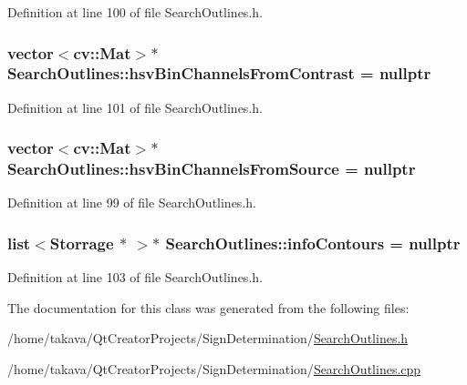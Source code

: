 Definition at line 100 of file Search\+Outlines.\+h.

\hypertarget{class_search_outlines_a236b9910b73900271297548d3744d506}{
\subsubsection[{hsv\+Bin\+Channels\+From\+Contrast}]{\setlength{\rightskip}{0pt plus 5cm}vector$<$cv\+::\+Mat$>$$\ast$ Search\+Outlines\+::hsv\+Bin\+Channels\+From\+Contrast = nullptr\hspace{0.3cm}{\ttfamily [private]}}}\label{class_search_outlines_a236b9910b73900271297548d3744d506}


Definition at line 101 of file Search\+Outlines.\+h.

\hypertarget{class_search_outlines_a455efed931c502f14dbf88c87974214d}{
\subsubsection[{hsv\+Bin\+Channels\+From\+Source}]{\setlength{\rightskip}{0pt plus 5cm}vector$<$cv\+::\+Mat$>$$\ast$ Search\+Outlines\+::hsv\+Bin\+Channels\+From\+Source = nullptr\hspace{0.3cm}{\ttfamily [private]}}}\label{class_search_outlines_a455efed931c502f14dbf88c87974214d}


Definition at line 99 of file Search\+Outlines.\+h.

\hypertarget{class_search_outlines_a1b1d7e6dd5c6c2b30c397f9f6d712dd1}{
\subsubsection[{info\+Contours}]{\setlength{\rightskip}{0pt plus 5cm}list$<${\bf Storrage} $\ast$ $>$$\ast$ Search\+Outlines\+::info\+Contours = nullptr\hspace{0.3cm}{\ttfamily [private]}}}\label{class_search_outlines_a1b1d7e6dd5c6c2b30c397f9f6d712dd1}


Definition at line 103 of file Search\+Outlines.\+h.



The documentation for this class was generated from the following files\+:\begin{DoxyCompactItemize}
\item 
/home/takava/\+Qt\+Creator\+Projects/\+Sign\+Determination/\hyperlink{_search_outlines_8h}{Search\+Outlines.\+h}\item 
/home/takava/\+Qt\+Creator\+Projects/\+Sign\+Determination/\hyperlink{_search_outlines_8cpp}{Search\+Outlines.\+cpp}\end{DoxyCompactItemize}
